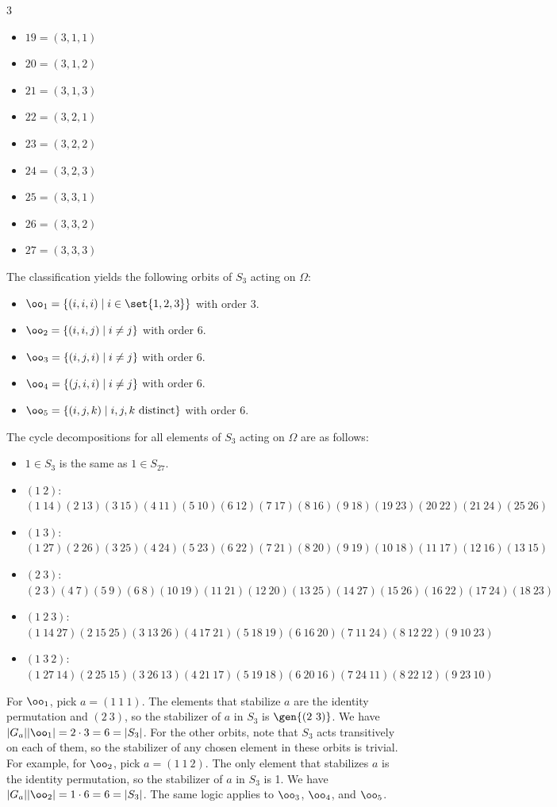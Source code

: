 \begin{solalph}
\begin{multicols}{3}
\begin{itemize}
			\item $19 = (3, 1, 1)$
			\item $20 = (3, 1, 2)$
			\item $21 = (3, 1, 3)$
			\item $22 = (3, 2, 1)$
			\item $23 = (3, 2, 2)$
			\item $24 = (3, 2, 3)$
			\item $25 = (3, 3, 1)$
			\item $26 = (3, 3, 2)$
			\item $27 = (3, 3, 3)$
		\end{itemize}
	\end{multicols}
	The classification yields the following orbits of $S_3$ acting on $\Omega$:
	\begin{itemize}
		\item $\oo_1 = \{(i, i, i) \mid i \in \set{1, 2, 3}\}$ with order 3.
		\item $\oo_2 = \{(i, i, j) \mid i \neq j\}$ with order 6.
		\item $\oo_3 = \{(i, j, i) \mid i \neq j\}$ with order 6.
		\item $\oo_4 = \{(j, i, i) \mid i \neq j\}$	with order 6.
		\item $\oo_5 = \{(i, j, k) \mid i, j, k \text{ distinct}\}$ with order 6.
	\end{itemize}
	The cycle decompositions for all elements of $S_3$ acting on $\Omega$ are as follows:
	\begin{itemize}
		\item $1 \in S_3$ is the same as $1 \in S_{27}$.
		\item $(1\ 2)$: $(1\ 14)(2\ 13)(3\ 15)(4\ 11)(5\ 10)(6\ 12)(7\ 17)(8\ 16)(9\ 18)(19\ 23)(20\ 22)(21\ 24)(25\ 26)$
		\item $(1\ 3)$: $(1\ 27)(2\ 26)(3\ 25)(4\ 24)(5\ 23)(6\ 22)(7\ 21)(8\ 20)(9\ 19)(10\ 18)(11\ 17)(12\ 16)(13\ 15)$
		\item $(2\ 3)$: $(2\ 3)(4\ 7)(5\ 9)(6\ 8)(10\ 19)(11\ 21)(12\ 20)(13\ 25)(14\ 27)(15\ 26)(16\ 22)(17\ 24)(18\ 23)$
		\item $(1\ 2\ 3)$: $(1\ 14\ 27)(2\ 15\ 25)(3\ 13\ 26)(4\ 17\ 21)(5\ 18\ 19)(6\ 16\ 20)(7\ 11\ 24)(8\ 12\ 22)(9\ 10\ 23)$
		\item $(1\ 3\ 2)$: $(1\ 27\ 14)(2\ 25\ 15)(3\ 26\ 13)(4\ 21\ 17)(5\ 19\ 18)(6\ 20\ 16)(7\ 24\ 11)(8\ 22\ 12)(9\ 23\ 10)$
	\end{itemize}
	For $\oo_1$, pick $a = (1\ 1\ 1)$. The elements that stabilize $a$ are the identity permutation and $(2\ 3)$, so the stabilizer of $a$ in $S_3$ is $\gen{(2\ 3)}$. We have $|G_a||\oo_1| = 2 \cdot 3 = 6 = |S_3|$. For the other orbits, note that $S_3$ acts transitively on each of them, so the stabilizer of any chosen element in these orbits is trivial. For example, for $\oo_2$, pick $a = (1\ 1\ 2)$. The only element that stabilizes $a$ is the identity permutation, so the stabilizer of $a$ in $S_3$ is 1. We have $|G_a||\oo_2| = 1 \cdot 6 = 6 = |S_3|$. The same logic applies to $\oo_3$, $\oo_4$, and $\oo_5$.

\end{solalph}
